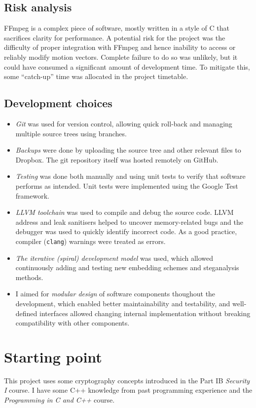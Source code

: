 \documentclass[12pt,british,twoside,notitlepage,usenames,dvipsnames,hypens,final]{report}
\numberwithin{equation}{section}
\numberwithin{figure}{section}
\begin{document}
\subsection{Risk analysis}
FFmpeg is a complex piece of software, mostly written in a style of C that sacrifices clarity for performance. A potential risk for the project was the difficulty of proper integration with FFmpeg and hence inability to access or reliably modify motion vectors. Complete failure to do so was unlikely, but it could have consumed a significant amount of development time. To mitigate this, some ``catch-up'' time was allocated in the project timetable.   

\subsection{Development choices}
\begin{itemize}
\item \emph{Git} was used for version control, allowing quick roll-back and managing multiple source trees using branches.
\item \emph{Backups} were done by uploading the source tree and other relevant files to Dropbox. The git repository itself was hosted remotely on GitHub.
\item \emph{Testing} was done both manually and using unit tests to verify that software performs as intended. Unit tests were implemented using the Google Test framework. 
\item \emph{LLVM toolchain} was used to compile and debug the source code. LLVM address and leak sanitisers helped to uncover memory-related bugs and the debugger was used to quickly identify incorrect code. As a good practice, compiler (\texttt{clang}) warnings were treated as errors. 
\item \emph{The iterative (spiral) development model} was used, which allowed continuously adding and testing new embedding schemes and steganalysis methods.
\item I aimed for \emph{modular design} of software components thoughout the development, which enabled better maintainability and testability, and well-defined interfaces allowed changing internal implementation without breaking compatibility with other components.
\end{itemize}

\section{Starting point}
This project uses some cryptography concepts introduced in the Part IB \textit{Security I} course. I have some C++ knowledge from past programming experience and the \textit{Programming in C and C++} course. 
\end{document}
